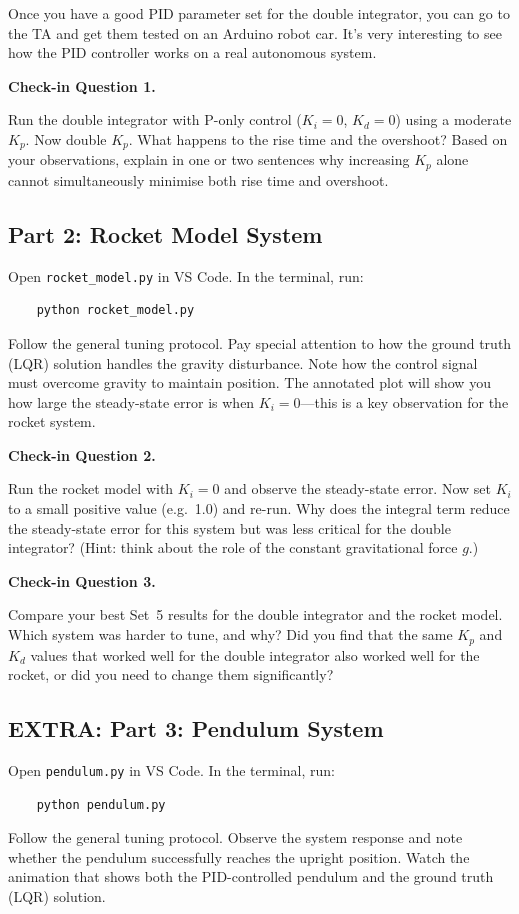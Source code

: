 \documentclass[12pt]{article}
\newenvironment{enroutequestion}[1]{%
    \begin{mdframed}[linewidth=1pt, linecolor=blue!60, backgroundcolor=blue!5,
                     innertopmargin=8pt, innerbottommargin=8pt,
                     innerleftmargin=10pt, innerrightmargin=10pt]
    \noindent\textbf{Check-in Question #1.}~\itshape
}{%
    \end{mdframed}
}
\begin{document}
Once you have a good PID parameter set for the double integrator, you can go to the TA and get them tested on an Arduino robot car.  It's very interesting to see how the PID controller works on a real autonomous system.  

\begin{enroutequestion}{1}
Run the double integrator with P-only control ($K_i = 0$, $K_d = 0$) using a moderate $K_p$.  Now double $K_p$.  What happens to the rise time and the overshoot?  Based on your observations, explain in one or two sentences why increasing $K_p$ alone cannot simultaneously minimise both rise time and overshoot.
\end{enroutequestion}

\subsection{Part 2: Rocket Model System}
Open \texttt{rocket\_model.py} in VS Code.  In the terminal, run:
\begin{verbatim}
    python rocket_model.py
\end{verbatim}
Follow the general tuning protocol. Pay special attention to how the ground truth (LQR) solution handles the gravity disturbance.  Note how the control signal must overcome gravity to maintain position.  The annotated plot will show you how large the steady-state error is when $K_i = 0$---this is a key observation for the rocket system.

\begin{enroutequestion}{2}
Run the rocket model with $K_i = 0$ and observe the steady-state error.  Now set $K_i$ to a small positive value (e.g.\ 1.0) and re-run.  Why does the integral term reduce the steady-state error for this system but was less critical for the double integrator?  (Hint: think about the role of the constant gravitational force $g$.)
\end{enroutequestion}

\begin{enroutequestion}{3}
Compare your best Set~5 results for the double integrator and the rocket model.  Which system was harder to tune, and why?  Did you find that the same $K_p$ and $K_d$ values that worked well for the double integrator also worked well for the rocket, or did you need to change them significantly?
\end{enroutequestion}

\subsection{EXTRA: Part 3: Pendulum System}
Open \texttt{pendulum.py} in VS Code.  In the terminal, run:
\begin{verbatim}
    python pendulum.py
\end{verbatim}
Follow the general tuning protocol. Observe the system response and note whether the pendulum successfully reaches the upright position.  Watch the animation that shows both the PID-controlled pendulum and the ground truth (LQR) solution.  
\end{document}
